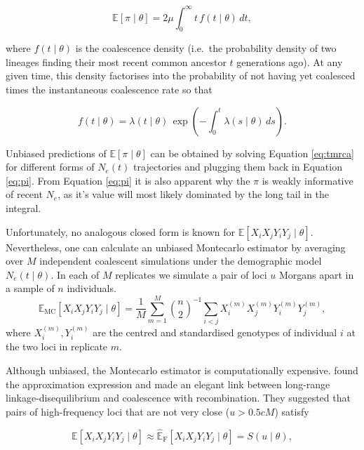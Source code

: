 \documentclass[12pt]{article}
\begin{document}
\begin{equation}
	\mathbb{E}[\pi \mid \theta] = 2\mu \int_0^\infty t\, f(t \mid \theta)\, dt,
	\label{eq:pi}
\end{equation}

where $f(t \mid \theta)$ is the coalescence density (i.e.\ the probability density of two lineages finding their most recent common ancestor $t$ generations ago). At any given time, this density factorises into the probability of not having yet coalesced times the instantaneous coalescence rate so that

\begin{equation}
	f(t \mid \theta) = \lambda(t \mid \theta)\, \exp\!\left(-\int_0^t \lambda(s \mid \theta)\, ds\right).
	\label{eq:tmrca}
\end{equation}

Unbiased predictions of $\mathbb{E}[\pi \mid \theta]$ can be obtained by solving Equation \ref{eq:tmrca} for different forms of $N_e(t)$ trajectories and plugging them back in Equation \ref{eq:pi}. From Equation \ref{eq:pi} it is also apparent why the $\pi$ is weakly informative of recent $N_e$, as it's value will most likely dominated by the long tail in the integral.

Unfortunately, no analogous closed form is known for $\mathbb E[X_iX_jY_iY_j \mid \theta]$. Nevertheless, one can calculate an unbiased Montecarlo estimator by averaging over $M$ independent coalescent simulations under the demographic model $N_e(t \mid \theta)$. In each of $M$ replicates we simulate a pair of loci $u$ Morgans apart in a sample of $n$ individuals.
\begin{equation}
	\widehat{\mathbb E}_{\mathrm{MC}}[X_iX_jY_iY_j \mid \theta] = \frac{1}{M} \sum_{m=1}^{M} \binom{n}{2}^{-1} \sum_{i<j} X_i^{(m)} X_j^{(m)} Y_i^{(m)} Y_j^{(m)},
	\label{eq:mc_ld}
\end{equation}
where $X_i^{(m)}, Y_i^{(m)}$ are the centred and standardised genotypes of individual $i$ at the two loci in replicate $m$.

Although unbiased, the Montecarlo estimator is computationally expensive. \citet{Fournier_2023} found the approximation expression and made an elegant link between long-range linkage-disequilibrium and coalescence with recombination. They suggested that pairs of high-frequency loci that are not very close ($u > 0.5 cM$)  satisfy

\begin{equation}
	\mathbb E[X_iX_jY_iY_j \mid \theta] \approx \widehat{\mathbb E}_{\mathrm{F}}[X_iX_jY_iY_j \mid \theta] =  S(u \mid \theta),
	\label{eq:fournier_ld}
\end{equation}
\end{document}
